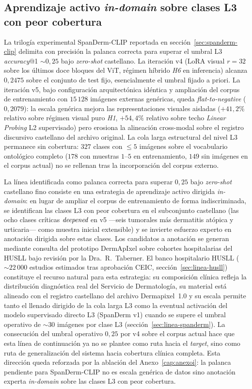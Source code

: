 \subsection{Aprendizaje activo \emph{in-domain} sobre clases L3
con peor cobertura}
\label{sec:linea-active-learning}

La trilogía experimental SpanDerm-CLIP reportada en
secci\'on~\ref{sec:spanderm-clip} delimita con precisión la palanca
correcta para superar el umbral L3 \emph{accuracy}@1
$\sim 0{,}25$ bajo \emph{zero-shot} castellano. La iteración v4
($\text{LoRA}$ visual $r=32$ sobre los últimos doce bloques del
ViT, régimen híbrido \emph{H6} en inferencia) alcanza
$0{,}2475$ sobre el conjunto de test fijo, esencialmente el
umbral fijado a priori. La iteración v5, bajo configuración
arquitectónica idéntica y ampliación del corpus de
entrenamiento con $15\,128$ imágenes externas genéricas, queda
\emph{flat-to-negative} ($0{,}2079$): la escala genérica
mejora las representaciones visuales aisladas ($+41{,}2\%$
relativo sobre régimen visual puro \emph{H1}, $+54{,}4\%$
relativo sobre techo \emph{Linear Probing} L2 supervisado) pero
erosiona la alineación cross-modal sobre el registro discursivo
castellano del archivo original. La cola larga estructural del nivel L3
permanece sin cobertura: $327$ clases con $\leq 5$ imágenes sobre
el vocabulario ontológico completo ($178$ con muestras $1$--$5$ en
entrenamiento, $149$ sin imágenes en el corpus actual) no se
rellenan tras la incorporación del corpus externo.

La línea identificada como palanca correcta para superar
$0{,}25$ bajo \emph{zero-shot} castellano fino consiste en una
estrategia de aprendizaje activo dirigida \emph{in-domain}: en
lugar de ampliar el corpus de entrenamiento de forma
indiscriminada, se identifican las clases L3 con peor cobertura
en el subconjunto castellano (las ocho clases críticas
$\emph{deepened}$ en v5 ---seis tumorales más dermatitis atópica
y urticaria--- como muestra inicial extensible) y se invierte
esfuerzo experto en anotación dirigida sobre estas clases. Los
candidatos a anotación se generan mediante consulta del
prototipo DermApIxel sobre cohortes hospitalarias del HUSLL bajo
revisión por la Dra.~R.~Taberner. El banco hospitalario HUSLL
($\sim 22\,000$ estudios estimados tras aprobación CEIC,
secci\'on~\ref{sec:linea-husll}) constituye el recurso natural
para esta estrategia: su composición clínica refleja la
distribución diagnóstica real del Servicio de Dermatología, su
material está alineado con el registro castellano del archivo
Dermapixel~1.0 y su escala permite tanto el llenado dirigido de
la cola larga L3 como la eventual activación del modelo
supervisado directo L3 (SpanDerm v1) cuando se supere el umbral
operativo de $\sim 30$ imágenes por clase L3
(secci\'on~\ref{sec:linea-spanderm}). La consecución del umbral
operativo $0{,}25$ por v4 sobre el corpus actual hace que esta
línea de continuación ya no se plantee como ruta hacia el
\emph{target}, sino como ruta de generalización del sistema
hacia cobertura clínica completa. Esta dirección queda reforzada
por la ablación del Anexo~\ref{cap:anexoi}: la palanca pendiente
para SpanDerm-CLIP no es escala genérica de datos sino anotación
experta \emph{in-domain} sobre las clases L3 con peor cobertura.

